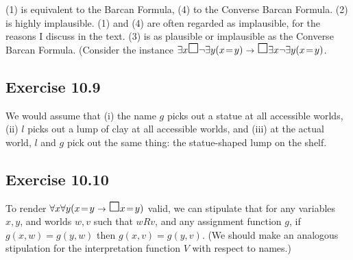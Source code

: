 \documentclass{scrartcl}
\let\oldbox\Box
\renewcommand\Box{\scaleobj{1.2}{\oldbox}}
\let\oldto\to
\renewcommand\to{\scaleobj{0.95}{\,\oldto\,}}
\begin{document}
%
%
  (1) is equivalent to the Barcan Formula, (4) to the Converse Barcan
  Formula. (2) is highly implausible. (1) and (4) are often regarded as
  implausible, for the reasons I discuss in the text. (3) is as plausible or
  implausible as the Converse Barcan Formula. (Consider the instance
  $\exists x \Box \neg \exists y(x\!=\!y) \to \Box\exists x \neg \exists
  y(x\!=\!y)$.

  \subsection*{Exercise 10.9}

%
%
  We would assume that (i) the name $g$ picks out a statue at all accessible
  worlds, (ii) $l$ picks out a lump of clay at all accessible worlds, and (iii)
  at the actual world, $l$ and $g$ pick out the same thing: the statue-shaped
  lump on the shelf.

  \subsection*{Exercise 10.10}

%
%
  To render $\forall x \forall y (x\!=\!y \to \Box x\!=\!y)$ valid, we can
  stipulate that for any variables $x,y$, and worlds $w,v$ such that $wRv$, and
  any assignment function $g$, if $g(x,w) = g(y,w)$ then $g(x,v)=g(y,v)$. (We
  should make an analogous stipulation for the interpretation function $V$ with
  respect to names.)
\end{document}
